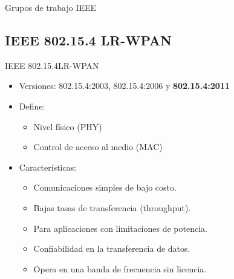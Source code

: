 \documentclass[aspectratio=169]{beamer}
\begin{document}
\begin{frame}{Grupos de trabajo IEEE}
\end{frame}

\subsection[IEEE 802.15.4]{IEEE 802.15.4 LR-WPAN}

\begin{frame}{IEEE 802.15.4}{LR-WPAN}
	\begin{itemize}
		\item Versiones: 802.15.4:2003, 802.15.4:2006 y \textbf{802.15.4:2011}
		\vspace{5px}
		\item Define:
		\begin{itemize}
			\item Nivel físico (PHY)
			\item Control de acceso al medio (MAC)
		\end{itemize}
		\vspace{5px}
		\item Características:
		\begin{itemize}
			\item Comunicaciones simples de bajo costo. 
			\item Bajas tasas de transferencia (throughput).
			\item Para aplicaciones con limitaciones de potencia.
			\item Confiabilidad en la transferencia de datos.
			\item Opera en una banda de frecuencia sin licencia.
		\end{itemize}
	\end{itemize}
	
\end{frame}
\end{document}
